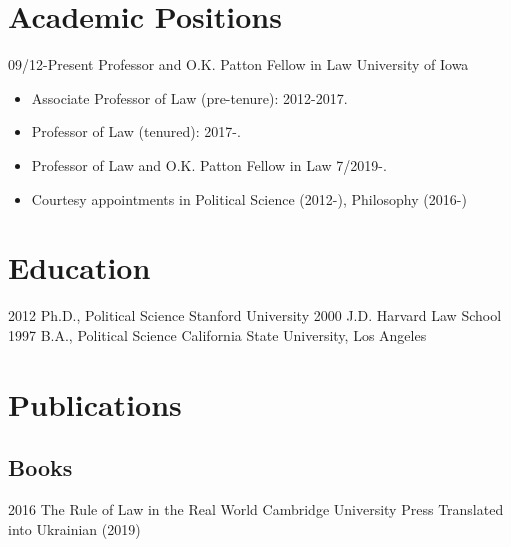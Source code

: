 \documentclass[letterpaper]{moderncv}
\begin{document}
\makecvtitle

\lfoot{\thepage}

%
%
\section{Academic Positions}
\cventry
{09/12-Present}
{Professor and O.K. Patton Fellow in Law}
{University of Iowa}
{}
{}
{\begin{itemize}%
	\item Associate Professor of Law (pre-tenure): 2012-2017.
	\item Professor of Law (tenured): 2017-.
  \item Professor of Law and O.K. Patton Fellow in Law 7/2019-.
	\item Courtesy appointments in Political Science (2012-), Philosophy (2016-)
	\end{itemize}}
%
%
\section{Education}
\cventry
{2012}
{Ph.D., Political Science}
{Stanford University}
{}
{}
{}
\cventry
{2000}
{J.D.}
{Harvard Law School}
{}
{}
{}
\cventry
{1997}
{B.A., Political Science}
{California State University, Los Angeles}
{}
{}
{}
%
%
\section{Publications}
\subsection{Books}
\cventry
{2016}
{The Rule of Law in the Real World}
{}
{Cambridge University Press}
{}
{Translated into Ukrainian (2019)}
\vspace{1mm}
\vspace{1mm}
\end{document}
